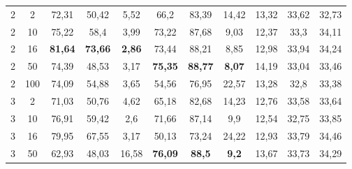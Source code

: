 \begin{table}[ht]
\begin{tabular}{cc|ccc|ccc|ccc}
        {2}                           & {2}    & {72,31}                             & {50,42}                             & {5,52}                                   & {66,2}           & {83,39}          & {14,42}         & {13,32}      & {33,62}     & {32,73}     \\
        {2}                           & {10}   & {75,22}                             & {58,4}                              & {3,99}                                   & {73,22}          & {87,68}          & {9,03}          & {12,37}      & {33,3}      & {34,11}     \\
        {2}                           & {16}   & {\textbf{81,64}}                    & {\textbf{73,66}}                    & {\textbf{2,86}}                          & {73,44}          & {88,21}          & {8,85}          & {12,98}      & {33,94}     & {34,24}     \\
        {2}                           & {50}   & {74,39}                             & {48,53}                             & {3,17}                                   & {\textbf{75,35}} & {\textbf{88,77}} & {\textbf{8,07}} & {14,19}      & {33,04}     & {33,46}     \\
        {2}                           & {100}  & {74,09}                             & {54,88}                             & {3,65}                                   & {54,56}          & {76,95}          & {22,57}         & {13,28}      & {32,8}      & {33,38}     \\
        {3}                           & {2}    & {71,03}                             & {50,76}                             & {4,62}                                   & {65,18}          & {82,68}          & {14,23}         & {12,76}      & {33,58}     & {33,64}     \\
        {3}                           & {10}   & {76,91}                             & {59,42}                             & {2,6}                                    & {71,66}          & {87,14}          & {9,9}           & {12,54}      & {32,75}     & {33,85}     \\
        {3}                           & {16}   & {79,95}                             & {67,55}                             & {3,17}                                   & {50,13}          & {73,24}          & {24,22}         & {12,93}      & {33,79}     & {34,46}     \\
        {3}                           & {50}   & {62,93}                             & {48,03}                             & {16,58}                                  & {\textbf{76,09}} & {\textbf{88,5}}  & {\textbf{9,2}}  & {13,67}      & {33,73}     & {34,29}     \\

\end{tabular}
\end{table}
